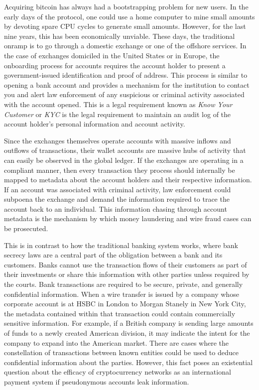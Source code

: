 
Acquiring bitcoin has always had a bootstrapping problem for new users. In the
early days of the protocol, one could use a home computer to mine small amounts
by devoting spare CPU cycles to generate small amounts. However, for the last
nine years, this has been economically unviable. These days, the traditional
onramp is to go through a domestic exchange or one of the offshore services. In
the case of exchanges domiciled in the United States or in Europe, the
onboarding process for accounts requires the account holder to present a
government-issued identification and proof of address. This process is similar
to opening a bank account and provides a mechanism for the institution to
contact you and alert law enforcement of any suspicious or criminal activity
associated with the account opened. This is a legal requirement known as
\textit{Know Your Customer} or \textit{KYC} is the legal requirement to maintain
an audit log of the account holder's personal information and account activity.


Since the exchanges themselves operate accounts with massive inflows and
outflows of transactions, their wallet accounts are massive hubs of activity
that can easily be observed in the global ledger. If the exchanges are operating
in a compliant manner, then every transaction they process should internally be
mapped to metadata about the account holders and their respective information.
If an account was associated with criminal activity, law enforcement could
subpoena the exchange and demand the information required to trace the account
back to an individual. This information chasing through account metadata is the
mechanism by which money laundering and wire fraud cases can be prosecuted.


This is in contrast to how the traditional banking system works, where bank
secrecy laws are a central part of the obligation between a bank and its
customers. Banks cannot use the transaction flows of their customers as part of
their investments or share this information with other parties unless required
by the courts. Bank transactions are required to be secure, private, and
generally confidential information. When a wire transfer is issued by a company
whose corporate account is at HSBC in London to Morgan Stanely in New York City,
the metadata contained within that transaction could contain commercially
sensitive information. For example, if a British company is sending large
amounts of funds to a newly created American division, it may indicate the
intent for the company to expand into the American market. There are cases where
the constellation of transactions between known entities could be used to deduce
confidential information about the parties. However, this fact poses an
existential question about the efficacy of cryptocurrency networks as an
international payment system if pseudonymous accounts leak information.

